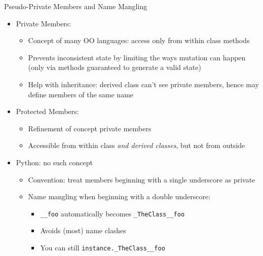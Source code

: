 \begin{frame}[fragile]{Pseudo-Private Members and Name Mangling}
%
\begin{itemize}
\item Private Members:
	\begin{itemize}
	\item Concept of many OO languages: access only from within class methods
	\item Prevents inconsistent state by limiting the ways mutation can happen (\thus only via methods guaranteed to generate a valid state)
	\item Help with inheritance: derived class can't see private members, hence may define members of the same name
	\end{itemize}
	\pause
\item Protected Members:
	\begin{itemize}
	\item Refinement of concept private members
	\item Accessible from within class \emph{and derived classes}, but not from outside
	\end{itemize}
	\pause
\item Python: no such concept
	\begin{itemize}
	\item Convention: treat members beginning with a single underscore as private
	\item Name mangling when beginning with a double underscore:
		\begin{itemize}
		\item \texttt{\_\_foo} automatically becomes \texttt{\_TheClass\_\_foo}
		\item Avoids (most) name clashes
		\item You can still \texttt{instance.\_TheClass\_\_foo}
		\end{itemize}
	\end{itemize}
\end{itemize}
%
\end{frame}


